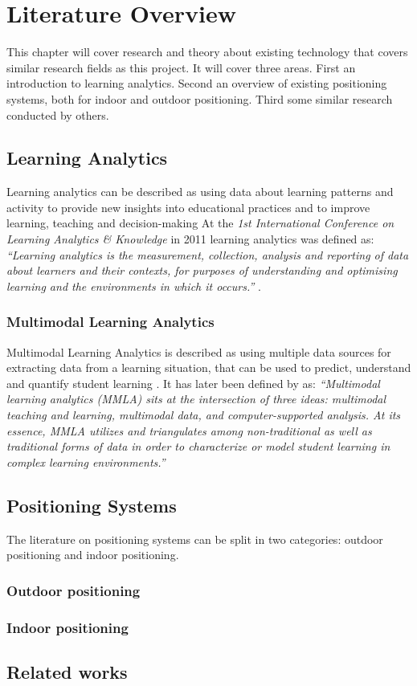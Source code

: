 \documentclass[../Main/thesis.tex]{subfiles}
\begin{document}
\chapter{Literature Overview}
\label{ch:literature_overview}
This chapter will cover research and theory about existing technology that covers similar research fields as this project. 
It will cover three areas.
First an introduction to learning analytics.
Second an overview of existing positioning systems, both for indoor and outdoor positioning.
Third some similar research conducted by others.

\section{Learning Analytics} 
Learning analytics can be described as using data about learning patterns and activity to provide new insights into educational practices and to improve learning, teaching and decision-making \citep{Siemens2012}
At the \textit{1st International Conference on Learning Analytics \& Knowledge} in 2011 learning analytics was defined as: \textit{``Learning analytics is the measurement, collection, analysis and reporting of data about learners and their contexts, for purposes of understanding and optimising learning and the environments in which it occurs.''} \citep{BuckinghamShum2012}.


\subsection*{Multimodal Learning Analytics}
Multimodal Learning Analytics is described as using multiple data sources for extracting data from a learning situation, that can be used to predict, understand and quantify student learning \citep{Worsley2010}.
It has later been defined by \citet{Worsley2016} as: \textit{``Multimodal learning analytics (MMLA) sits at the intersection of three ideas: multimodal teaching and learning, multimodal data, and computer-supported analysis. At its essence, MMLA utilizes and triangulates among non-traditional as well as traditional forms of data in order to characterize or model student learning in complex learning environments.''}

\section{Positioning Systems}
The literature on positioning systems can be split in two categories: outdoor positioning and indoor positioning.

\subsection{Outdoor positioning}

\subsection{Indoor positioning}


\section{Related works}
\end{document}
